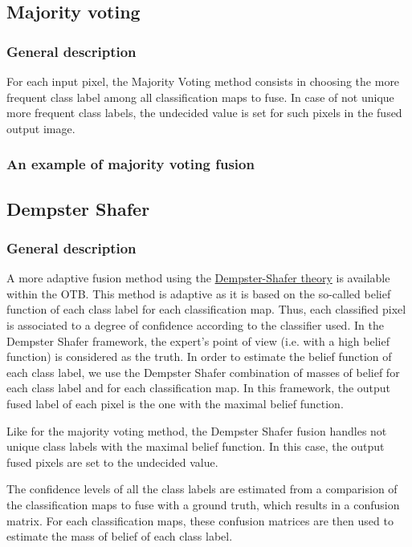 \subsection{Majority voting}
\subsubsection{General description}
For each input pixel, the Majority Voting method consists in choosing the more 
frequent class label among all classification maps to fuse. In case of not unique 
more frequent class labels, the undecided value is set for such pixels in 
the fused output image.

\subsubsection{An example of majority voting fusion}
\ifitkFullVersion

\fi


\subsection{Dempster Shafer}

\subsubsection{General description}
A more adaptive fusion method using the 
\href{http://en.wikipedia.org/wiki/Dempster\%E2\%80\%93Shafer_theory}{Dempster-Shafer theory} 
is available within the OTB. This method is adaptive as it is based on the 
so-called belief function of each class label for each classification map. Thus, 
each classified pixel is associated to a degree of confidence according to the 
classifier used. In the Dempster Shafer framework, the expert's point of view 
(i.e. with a high belief function) is considered as the truth. In order to 
estimate the belief function of each class label, we use the Dempster Shafer 
combination of masses of belief for each class label and for each classification 
map. In this framework, the output fused label of each pixel is the one with the 
maximal belief function.

Like for the majority voting method, the Dempster Shafer fusion handles not 
unique class labels with the maximal belief function. In this case, the output 
fused pixels are set to the undecided value.

The confidence levels of all the class labels are estimated from a comparision of 
the classification maps to fuse with a ground truth, which results in a 
confusion matrix. For each classification maps, these confusion matrices are then 
used to estimate the mass of belief of each class label.


